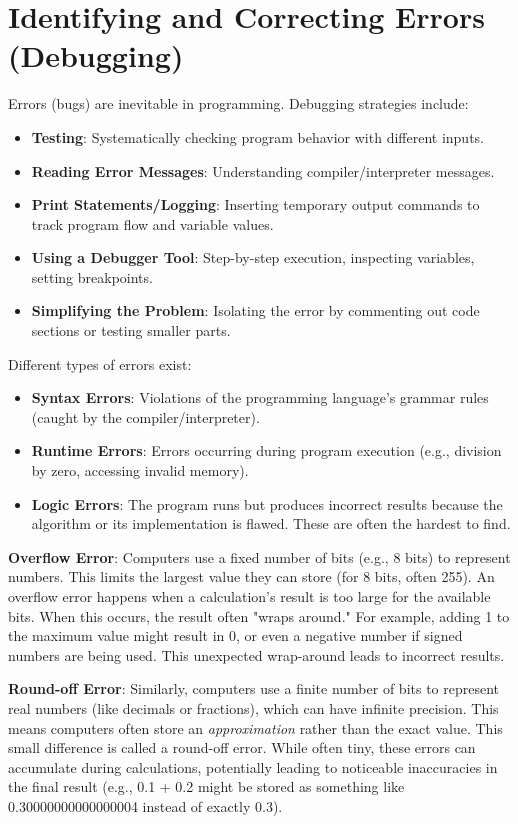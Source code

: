 \documentclass[11pt,oneside]{book}
\begin{document}
\section{Identifying and Correcting Errors (Debugging)}
\label{sec:debugging}
Errors (bugs) are inevitable in programming. Debugging strategies include:
\begin{itemize}
    \item \textbf{Testing}: Systematically checking program behavior with different inputs.
    \item \textbf{Reading Error Messages}: Understanding compiler/interpreter messages.
    \item \textbf{Print Statements/Logging}: Inserting temporary output commands to track program flow and variable values.
    \item \textbf{Using a Debugger Tool}: Step-by-step execution, inspecting variables, setting breakpoints.
    \item \textbf{Simplifying the Problem}: Isolating the error by commenting out code sections or testing smaller parts.
\end{itemize}
Different types of errors exist:
\begin{itemize}
    \item \textbf{Syntax Errors}: Violations of the programming language's grammar rules (caught by the compiler/interpreter).
    \item \textbf{Runtime Errors}: Errors occurring during program execution (e.g., division by zero, accessing invalid memory).
    \item \textbf{Logic Errors}: The program runs but produces incorrect results because the algorithm or its implementation is flawed. These are often the hardest to find.
\end{itemize}

\textbf{Overflow Error}: Computers use a fixed number of bits (e.g., 8 bits) to represent numbers. This limits the largest value they can store (for 8 bits, often 255). An overflow error happens when a calculation's result is too large for the available bits. When this occurs, the result often "wraps around." For example, adding 1 to the maximum value might result in 0, or even a negative number if signed numbers are being used. This unexpected wrap-around leads to incorrect results.

\textbf{Round-off Error}: Similarly, computers use a finite number of bits to represent real numbers (like decimals or fractions), which can have infinite precision. This means computers often store an \textit{approximation} rather than the exact value. This small difference is called a round-off error. While often tiny, these errors can accumulate during calculations, potentially leading to noticeable inaccuracies in the final result (e.g., 0.1 + 0.2 might be stored as something like 0.30000000000000004 instead of exactly 0.3).
\end{document}
